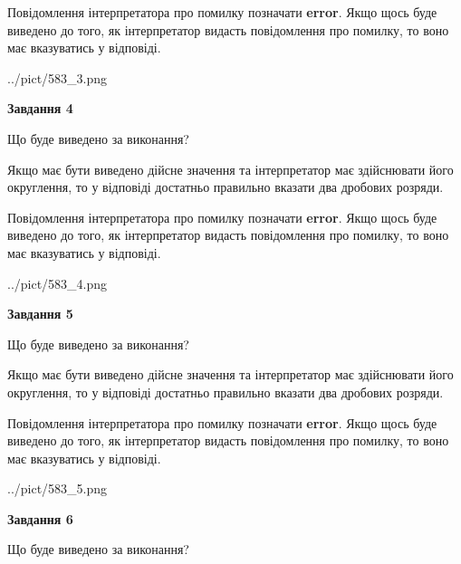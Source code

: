 \documentclass[12pt, ukrainian]{article}
\begin{document}
{\begin {Large}
Повідомлення інтерпретатора про помилку позначати \textbf{error}.
Якщо щось буде виведено до того, як інтерпретатор видасть повідомлення про помилку, 
то воно має вказуватись у відповіді. \par

\begin{center}
	{../pict/583_3.png}
\end{center}
\newpage

{\begin {center}\textbf{Завдання 4}\end {center}}\par
Що буде виведено за виконання? \par

Якщо має бути виведено дійсне значення та інтерпретатор має здійснювати його округлення, 
то у відповіді достатньо правильно вказати два дробових розряди.

Повідомлення інтерпретатора про помилку позначати \textbf{error}.
Якщо щось буде виведено до того, як інтерпретатор видасть повідомлення про помилку, 
то воно має вказуватись у відповіді. \par

\begin{center}
	{../pict/583_4.png}
\end{center}
\newpage

{\begin {center}\textbf{Завдання 5}\end {center}}\par
Що буде виведено за виконання? \par

Якщо має бути виведено дійсне значення та інтерпретатор має здійснювати його округлення, 
то у відповіді достатньо правильно вказати два дробових розряди.

Повідомлення інтерпретатора про помилку позначати \textbf{error}.
Якщо щось буде виведено до того, як інтерпретатор видасть повідомлення про помилку, 
то воно має вказуватись у відповіді. \par

\begin{center}
	{../pict/583_5.png}
\end{center}
\newpage

{\begin {center}\textbf{Завдання 6}\end {center}}\par
Що буде виведено за виконання? \par


\end{Large}}
\end{document}
